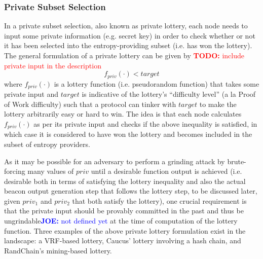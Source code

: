 \documentclass[letterpaper,twocolumn,10pt]{article}
\theoremstyle{definition}
\theoremstyle{remark}
\newcommand{\todo}[1]{\textcolor{red}{\textbf{TODO:} #1}}
\newcommand{\joenote}[1]{\textcolor{blue}{\textbf{JOE:} #1}}
\begin{document}
\subsubsection{Private Subset Selection}
In a private subset selection, also known as private lottery, each node needs to input some private information (e.g. secret key) in order to check whether or not it has been selected into the entropy-providing subset (i.e. has won the lottery). The general formulation of a private lottery can be given by
\todo{include private input in the description}
\[
f_{priv}(\cdot) < target
\]
where $f_{priv}(\cdot)$ is a lottery function (i.e. pseudorandom function) that takes some private input and $target$ is indicative of the lottery's ``difficulty level'' (a la Proof of Work difficulty) such that a protocol can tinker with $target$ to make the lottery arbitrarily easy or hard to win. The idea is that each node calculates $f_{priv}(\cdot)$ as per its private input and checks if the above inequality is satisfied, in which case it is considered to have won the lottery and becomes included in the subset of entropy providers.

As it may be possible for an adversary to perform a grinding attack by brute-forcing many values of $priv$ until a desirable function output is achieved (i.e. desirable both in terms of satisfying the lottery inequality and also the actual beacon output generation step that follows the lottery step, to be discussed later, given $priv_1$ and $priv_2$ that both satisfy the lottery), one crucial requirement is that the private input should be provably committed in the past and thus be ungrindable\joenote{not defined yet} at the time of computation of the lottery function. Three examples of the above private lottery formulation exist in the landscape: a VRF-based lottery, Caucus' \cite{azouvi2018winning} lottery involving a hash chain, and RandChain's \cite{han2020randchain} mining-based lottery.
\end{document}
